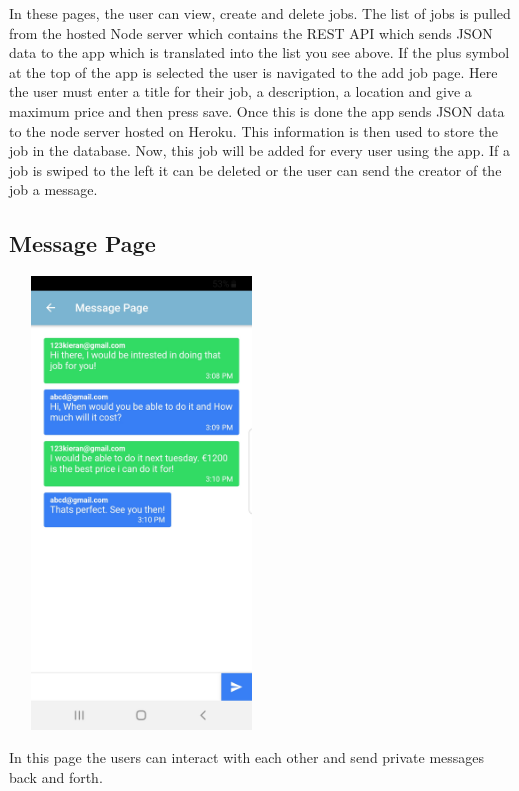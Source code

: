 In these pages, the user can view, create and delete jobs. The list of jobs is pulled from the hosted Node server which contains the REST API which sends JSON data to the app which is translated into the list you see above. If the plus symbol at the top of the app is selected the user is navigated to the add job page. Here the user must enter a title for their job, a description, a location and give a maximum price and then press save. Once this is done the app sends JSON data to the node server hosted on Heroku. This information is then used to store the job in the database. Now, this job will be added for every user using the app. If a job is swiped to the left it can be deleted or the user can send the creator of the job a message.
\subsection{Message Page}
\begin{center}    
	\includegraphics[width=7cm, height=12cm]{img/message.jpg}
\end{center}
In this page the users can interact with each other and send private messages back and forth.















